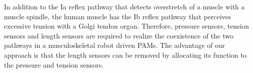 In addition to the Ia reflex pathway that detects overstretch of a muscle with a muscle spindle, the human muscle has the Ib reflex pathway that perceives excessive tension with a Golgi tendon organ. Therefore, pressure sensors, tension sensors and length sensors are required to realize the coexistence of the two pathways in a musculoskeletal robot driven PAMs. The advantage of our approach is that the length sensors can be removed by allocating its function to the pressure and tension sensors.